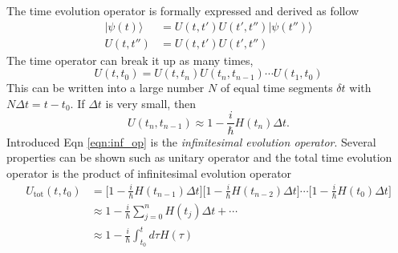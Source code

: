 \documentclass{article}
\begin{document}
The time evolution operator is formally expressed and derived as follow
\begin{align}
  |\psi(t)\rangle & = U(t,t')U(t',t'')|\psi(t'')\rangle \\
  U(t,t'') & = U(t,t')U(t',t'')
\end{align}
The time operator can break it up as many times,
\begin{equation}
  U(t,t_0) = U(t,t_n)U(t_n,t_{n-1})\cdots U(t_1,t_0)
  \label{eqn:segs}
\end{equation}
This can be written into a large number $N$ of equal time segments $\delta t$
with $N\Delta t = t - t_0$. If $\Delta t$ is very small, then
\begin{equation}
  U(t_n,t_{n-1})\approx 1 - \frac{i}{\hbar}H(t_n)\Delta t.
  \label{eqn:inf_op}
\end{equation}
Introduced Eqn \eqref{eqn:inf_op} is the \textit{infinitesimal evolution operator}. Several properties
can be shown such as unitary operator and the total time evolution operator is
the product of infinitesimal evolution operator
\begin{align}
  U_{\text{tot}}(t,t_0) & = \Bigg[1-\frac{i}{\hbar}H(t_{n-1})\Delta t\Bigg]\Bigg[1-\frac{i}{\hbar}H(t_{n-2})\Delta t\Bigg]
  \cdots \Bigg[1-\frac{i}{\hbar}H(t_0)\Delta t\Bigg] \\
  & \approx 1 - \frac{i}{\hbar}\sum^n_{j=0}H(t_j)\Delta t + \cdots \\
  & \approx 1 - \frac{i}{\hbar}\int^t_{t_0}d\tau H(\tau)
\end{align}
\end{document}
